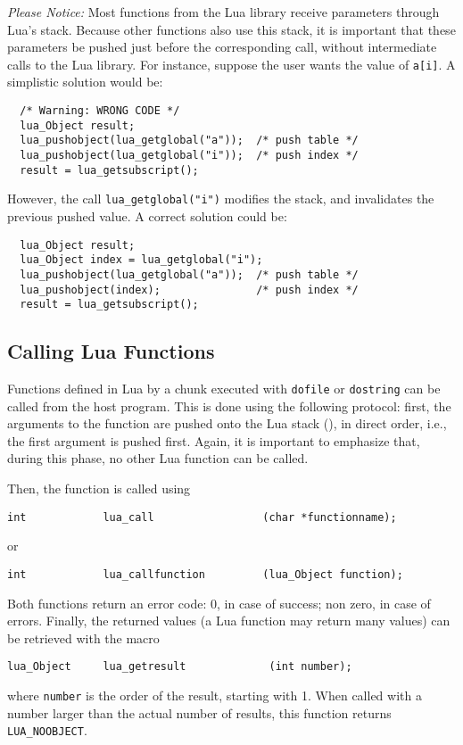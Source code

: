 {\em Please Notice:\/}
Most functions from the Lua library receive parameters through Lua's stack.
Because other functions also use this stack,
it is important that these
parameters be pushed just before the corresponding call,
without intermediate calls to the Lua library.
For instance, suppose the user wants the value of \verb'a[i]'.
A simplistic solution would be:
\begin{verbatim}
  /* Warning: WRONG CODE */
  lua_Object result;
  lua_pushobject(lua_getglobal("a"));  /* push table */
  lua_pushobject(lua_getglobal("i"));  /* push index */
  result = lua_getsubscript();
\end{verbatim}
However, the call \verb'lua_getglobal("i")' modifies the stack,
and invalidates the previous pushed value.
A correct solution could be:
\begin{verbatim}
  lua_Object result;
  lua_Object index = lua_getglobal("i");
  lua_pushobject(lua_getglobal("a"));  /* push table */
  lua_pushobject(index);               /* push index */
  result = lua_getsubscript();
\end{verbatim}

\subsection{Calling Lua Functions}
Functions defined in Lua by a chunk executed with
\verb'dofile' or \verb'dostring' can be called from the host program.
This is done using the following protocol:
first, the arguments to the function are pushed onto the Lua stack
(), in direct order, i.e., the first argument is pushed first.
Again, it is important to emphasize that, during this phase,
no other Lua function can be called.

Then, the function is called using
\begin{verbatim}
int            lua_call                 (char *functionname);
\end{verbatim}
or
\begin{verbatim}
int            lua_callfunction         (lua_Object function);
\end{verbatim}
Both functions return an error code:
0, in case of success; non zero, in case of errors.
Finally, the returned values (a Lua function may return many values)
can be retrieved with the macro
\begin{verbatim}
lua_Object     lua_getresult             (int number);
\end{verbatim}
where \verb'number' is the order of the result, starting with 1.
When called with a number larger than the actual number of results,
this function returns \verb'LUA_NOOBJECT'.

